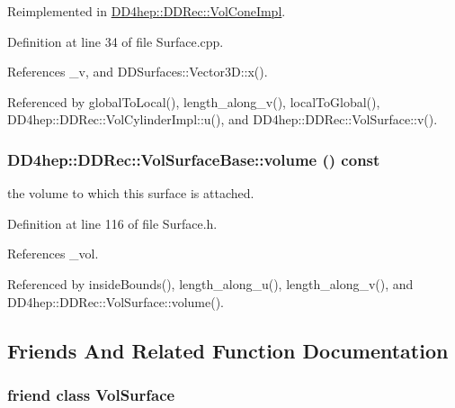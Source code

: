 Reimplemented in \hyperlink{class_d_d4hep_1_1_d_d_rec_1_1_vol_cone_impl_a305c9b455b4e958dbb511f9136ecaf8b}{DD4hep::DDRec::VolConeImpl}.

Definition at line 34 of file Surface.cpp.

References \_\-v, and DDSurfaces::Vector3D::x().

Referenced by globalToLocal(), length\_\-along\_\-v(), localToGlobal(), DD4hep::DDRec::VolCylinderImpl::u(), and DD4hep::DDRec::VolSurface::v().\hypertarget{class_d_d4hep_1_1_d_d_rec_1_1_vol_surface_base_ad07cf1518f472a2b5b99d28f7f60b889}{
\subsubsection[{volume}]{ DD4hep::DDRec::VolSurfaceBase::volume () const}}
\label{class_d_d4hep_1_1_d_d_rec_1_1_vol_surface_base_ad07cf1518f472a2b5b99d28f7f60b889}


the volume to which this surface is attached. 

Definition at line 116 of file Surface.h.

References \_\-vol.

Referenced by insideBounds(), length\_\-along\_\-u(), length\_\-along\_\-v(), and DD4hep::DDRec::VolSurface::volume().

\subsection{Friends And Related Function Documentation}
\hypertarget{class_d_d4hep_1_1_d_d_rec_1_1_vol_surface_base_aac662841c478da205fce85f4b5b036f2}{
\subsubsection[{VolSurface}]{\setlength{\rightskip}{0pt plus 5cm}friend class {\bf VolSurface}}}
\label{class_d_d4hep_1_1_d_d_rec_1_1_vol_surface_base_aac662841c478da205fce85f4b5b036f2}


